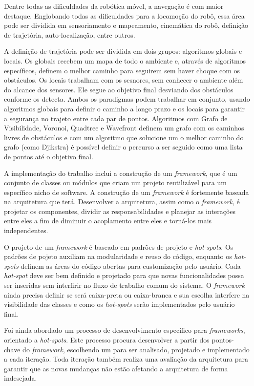 Dentre todas as dificuldades da robótica móvel, a navegação é com maior destaque. Englobando todas as dificuldades para a locomoção do robô, essa área pode ser dividida em sensoriamento e mapeamento, cinemática do robô, definição de trajetória, auto-localização, entre outros.

A definição de trajetória pode ser dividida em dois grupos: algoritmos globais e locais. Os globais recebem um mapa de todo o ambiente e, através de algoritmos específicos, definem o melhor caminho para seguirem sem haver choque com os obstáculos. Os locais trabalham com os sesnores, sem conhecer o ambiente além do alcance dos sensores. Ele segue ao objetivo final desviando dos obstáculos conforme os detecta. Ambos os paradigmas podem trabalhar em conjunto, usando algoritmos globais para definir o caminho a longo prazo e os locais para garantir a segurança no trajeto entre cada par de pontos. Algoritmos com Grafo de Visibilidade, Voronoi, Quadtree e Wavefront definem um grafo com os caminhos livres de obstáculos e com um algoritmo que solucione um o melhor caminho do grafo (como Djikstra) é possível definir o percurso a ser seguido como uma lista de pontos até o objetivo final.

A implementação do trabalho inclui a construção de um \textit{framework}, que é um conjunto de classes ou módulos que criam um projeto reutilizável para um específico nicho de software. A construção de um \textit{framework} é fortemente baseada na arquitetura que terá. Desenvolver a arquitetura, assim como o \textit{framework}, é projetar os componentes, dividir as responsabilidades e planejar as interações entre eles a fim de diminuir o acoplamento entre eles e torná-los mais independentes.

O projeto de um \textit{framework} é baseado em padrões de projeto e \textit{hot-spots}. Os padrões de pojeto auxiliam na modularidade e reuso do código, enquanto os \textit{hot-spots} definem as áreas do código abertas para customização pelo usuário. Cada \textit{hot-spot} deve ser bem definido e projetado para que novas funcionalidades possa ser inseridas sem interfirir no fluxo de trabalho comum do sistema. O \textit{framework} ainda precisa definir se será caixa-preta ou caixa-branca e sua escolha interfere na visibilidade das classes e como os \textit{hot-spots} serão implementados pelo usuário final.

Foi ainda abordado um processo de desenvolvimento específico para \textit{frameworks}, orientado a \textit{hot-spots}. Este processo procura desenvolver a partir dos pontos-chave do \textit{framework}, escolhendo um para ser analisado, projetado e implementado a cada iteração. Toda iteração também realiza uma avaliação da arquitetura para garantir que as novas mudanças não estão afetando a arquitetura de forma indesejada.